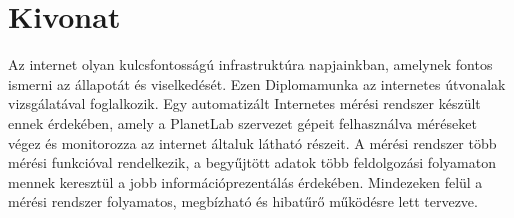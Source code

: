 \chapter*{Kivonat}


Az internet olyan kulcsfontosságú infrastruktúra napjainkban, amelynek fontos ismerni az állapotát és viselkedését. Ezen Diplomamunka az internetes útvonalak vizsgálatával foglalkozik. Egy automatizált Internetes mérési rendszer készült ennek érdekében, amely a PlanetLab szervezet gépeit felhasználva méréseket végez és monitorozza az internet általuk látható részeit. A mérési rendszer több mérési funkcióval rendelkezik, a begyűjtött adatok több feldolgozási folyamaton mennek keresztül a jobb információprezentálás érdekében. Mindezeken felül a mérési rendszer folyamatos, megbízható és hibatűrő működésre lett tervezve.











